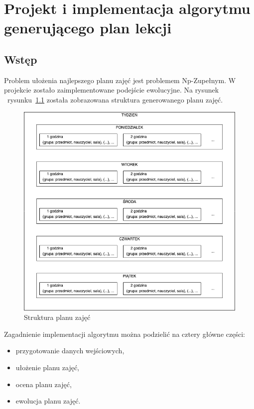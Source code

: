 
\chapter{Projekt i implementacja algorytmu generującego plan lekcji}

\section{Wstęp}
Problem ułożenia najlepszego planu zajęć jest problemem Np-Zupełnym. W projekcie zostało zaimplementowane podejście ewolucyjne. Na rysunek ~rysunku~\ref{rys:time_table_dia} została zobrazowana struktura generowanego planu zajęć.

\begin{figure}[h]
\centering\includegraphics[width=\textwidth]{figures/time_table_dia}
\caption{Struktura planu zajęć}\label{rys:time_table_dia}
\end{figure}


Zagadnienie implementacji algorytmu można podzielić na cztery główne części: 
\begin{itemize}
	\item przygotowanie danych wejściowych,
	\item ułożenie planu zajęć,
	\item ocena planu zajęć,
	\item ewolucja planu zajęć.
\end{itemize}


